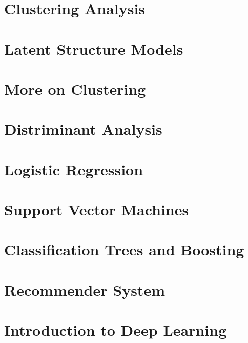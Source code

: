 \documentclass[
]{book}
\begin{document}
\hypertarget{clustering-analysis}{%
\chapter{Clustering Analysis}\label{clustering-analysis}}

\hypertarget{latent-structure-models}{%
\chapter{Latent Structure Models}\label{latent-structure-models}}

\hypertarget{more-on-clustering}{%
\chapter{More on Clustering}\label{more-on-clustering}}

\hypertarget{distriminant-analysis}{%
\chapter{Distriminant Analysis}\label{distriminant-analysis}}

\hypertarget{logistic-regression}{%
\chapter{Logistic Regression}\label{logistic-regression}}

\hypertarget{support-vector-machines}{%
\chapter{Support Vector Machines}\label{support-vector-machines}}

\hypertarget{classification-trees-and-boosting}{%
\chapter{Classification Trees and Boosting}\label{classification-trees-and-boosting}}

\hypertarget{recommender-system}{%
\chapter{Recommender System}\label{recommender-system}}

\hypertarget{introduction-to-deep-learning}{%
\chapter{Introduction to Deep Learning}\label{introduction-to-deep-learning}}

  
\end{document}
